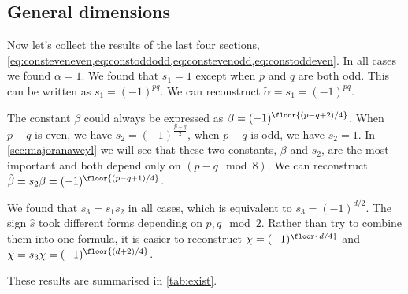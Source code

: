 \documentclass[11pt]{article}
\newcommand{\alphat}{\tilde{\alpha}}
\newcommand{\betat}{\tilde{\beta}}
\newcommand{\chit}{\tilde{\chi}}
\begin{document}

\subsection{General dimensions}\label{sec:constgendim}

Now let's collect the results of the last four sections,
\cref{eq:consteveneven,eq:constoddodd,eq:constevenodd,eq:constoddeven}.
In all cases we found $\alpha = 1$.
We found that $s_1 = 1$ except when $p$ and $q$ are both odd.
This can be written as $s_1 = (-1)^{pq}$.
We can reconstruct $\alphat = s_1 = (-1)^{pq}$.

The constant $\beta$ could always be expressed as $\beta = (-1)^{\floor{(p-q+2)/4}}$.
When $p-q$ is even, we have $s_2 = (-1)^{\frac{p-q}{2}}$, when $p-q$ is odd, we have $s_2 = 1$.
In \cref{sec:majoranaweyl} we will see that these two constants, $\beta$ and $s_2$, are the most important and both depend only on
\( (p - q \mod 8) \).
We can reconstruct $\betat = s_2 \beta = (-1)^{\floor{(p-q+1)/4}}$.

We found that $s_3 = s_1 s_2$ in all cases, which is equivalent to $s_3 = (-1)^{d/2}$.
The sign $\hat{s}$ took different forms depending on $p,q \mod 2$.
Rather than try to combine them into one formula, it is easier to reconstruct $\chi = (-1)^{\floor{d/4}}$ and $\chit = s_3 \chi = (-1)^{\floor{(d+2)/4}}$.

These results are summarised in \cref{tab:exist}.
\end{document}
